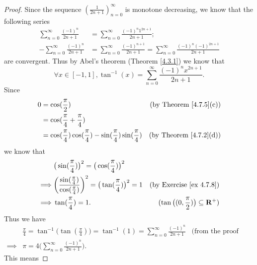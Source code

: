 \begin{proof}
    Since the sequence \((\frac{1}{2n + 1})_{n = 0}^\infty\) is monotone decreasing, we know that the following series
    \begin{align*}
        \sum_{n = 0}^\infty \frac{(-1)^n}{2n + 1}  & = \sum_{n = 0}^\infty \frac{(-1)^n 1^{2n + 1}}{2n + 1};                                                     \\
        -\sum_{n = 0}^\infty \frac{(-1)^n}{2n + 1} & = \sum_{n = 0}^\infty \frac{(-1)^{n + 1}}{2n + 1} = \sum_{n = 0}^\infty \frac{(-1)^n (-1)^{2n + 1}}{2n + 1}
    \end{align*}
    are convergent.
    Thus by Abel's theorem (Theorem \ref{4.3.1}) we know that
    \[
        \forall x \in [-1, 1], \tan^{-1}(x) = \sum_{n = 0}^\infty \frac{(-1)^n x^{2n + 1}}{2n + 1}.
    \]
    Since
    \begin{align*}
        0 & = \cos(\frac{\pi}{2})                                                               & \text{(by Theorem \ref{4.7.5}(c))} \\
          & = \cos(\frac{\pi}{4} + \frac{\pi}{4})                                                                                    \\
          & = \cos(\frac{\pi}{4}) \cos(\frac{\pi}{4}) - \sin(\frac{\pi}{4}) \sin(\frac{\pi}{4}) & \text{(by Theorem \ref{4.7.2}(d))}
    \end{align*}
    we know that
    \begin{align*}
                 & \big(\sin(\frac{\pi}{4})\big)^2 = \big(\cos(\frac{\pi}{4})\big)^2                                                                                               \\
        \implies & \bigg(\frac{\sin(\frac{\pi}{4})}{\cos(\frac{\pi}{4})}\bigg)^2 = \big(\tan(\frac{\pi}{4})\big)^2 = 1 & \text{(by Exercise \ref{ex 4.7.8})}                       \\
        \implies & \tan(\frac{\pi}{4}) = 1.                                                                            & (\tan\big((0, \frac{\pi}{2})\big) \subseteq \mathbf{R}^+)
    \end{align*}
    Thus we have
    \begin{align*}
                 & \frac{\pi}{4} = \tan^{-1}\big(\tan(\frac{\pi}{4})\big) = \tan^{-1}(1) = \sum_{n = 0}^\infty \frac{(-1)^n}{2n + 1} & \text{(from the proof above)} \\
        \implies & \pi = 4 \bigg(\sum_{n = 0}^\infty \frac{(-1)^n}{2n + 1}\bigg).
    \end{align*}
    This means

\end{proof}
